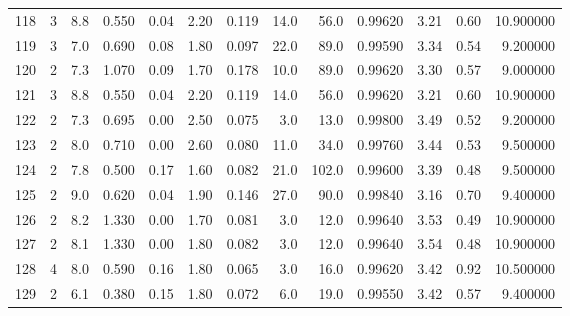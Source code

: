 \begin{tabular}{lrrrrrrrrrrrr}
118  &        3 &            8.8 &             0.550 &         0.04 &            2.20 &      0.119 &                 14.0 &                  56.0 &  0.99620 &  3.21 &       0.60 &  10.900000 \\
119  &        3 &            7.0 &             0.690 &         0.08 &            1.80 &      0.097 &                 22.0 &                  89.0 &  0.99590 &  3.34 &       0.54 &   9.200000 \\
120  &        2 &            7.3 &             1.070 &         0.09 &            1.70 &      0.178 &                 10.0 &                  89.0 &  0.99620 &  3.30 &       0.57 &   9.000000 \\
121  &        3 &            8.8 &             0.550 &         0.04 &            2.20 &      0.119 &                 14.0 &                  56.0 &  0.99620 &  3.21 &       0.60 &  10.900000 \\
122  &        2 &            7.3 &             0.695 &         0.00 &            2.50 &      0.075 &                  3.0 &                  13.0 &  0.99800 &  3.49 &       0.52 &   9.200000 \\
123  &        2 &            8.0 &             0.710 &         0.00 &            2.60 &      0.080 &                 11.0 &                  34.0 &  0.99760 &  3.44 &       0.53 &   9.500000 \\
124  &        2 &            7.8 &             0.500 &         0.17 &            1.60 &      0.082 &                 21.0 &                 102.0 &  0.99600 &  3.39 &       0.48 &   9.500000 \\
125  &        2 &            9.0 &             0.620 &         0.04 &            1.90 &      0.146 &                 27.0 &                  90.0 &  0.99840 &  3.16 &       0.70 &   9.400000 \\
126  &        2 &            8.2 &             1.330 &         0.00 &            1.70 &      0.081 &                  3.0 &                  12.0 &  0.99640 &  3.53 &       0.49 &  10.900000 \\
127  &        2 &            8.1 &             1.330 &         0.00 &            1.80 &      0.082 &                  3.0 &                  12.0 &  0.99640 &  3.54 &       0.48 &  10.900000 \\
128  &        4 &            8.0 &             0.590 &         0.16 &            1.80 &      0.065 &                  3.0 &                  16.0 &  0.99620 &  3.42 &       0.92 &  10.500000 \\
129  &        2 &            6.1 &             0.380 &         0.15 &            1.80 &      0.072 &                  6.0 &                  19.0 &  0.99550 &  3.42 &       0.57 &   9.400000 \\

\end{tabular}
